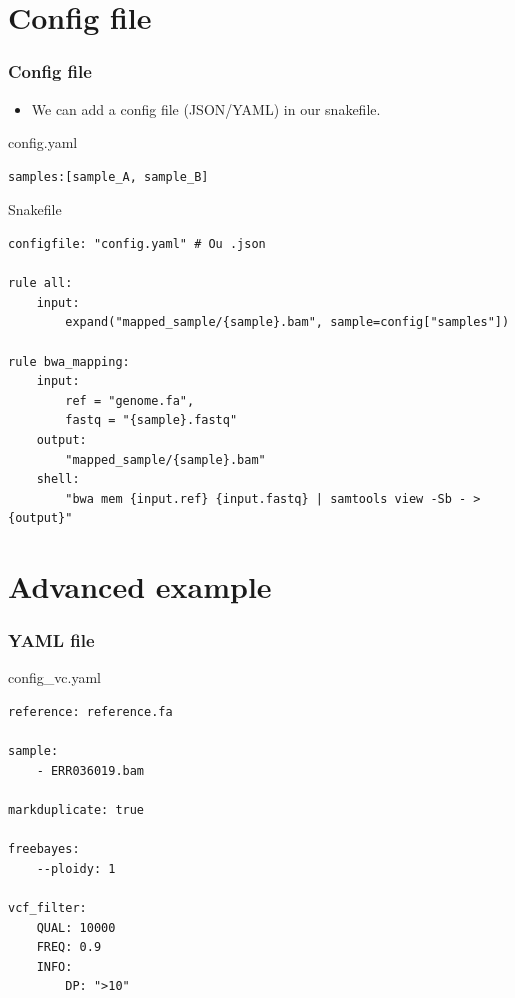 \documentclass{beamer}
\begin{document}
\section{Config file}

\begin{frame}[fragile]
    \frametitle{Config file}
    \begin{itemize}
        \item We can add a config file (JSON/YAML) in our snakefile.
    \end{itemize}
    \begin{block}{config.yaml}
        \begin{lstlisting}
samples:[sample_A, sample_B]
        \end{lstlisting}
    \end{block}
    \begin{block}{Snakefile}
    \begin{lstlisting}
configfile: "config.yaml" # Ou .json

rule all:
    input:
        expand("mapped_sample/{sample}.bam", sample=config["samples"])

rule bwa_mapping:
    input:
        ref = "genome.fa",
        fastq = "{sample}.fastq"
    output:
        "mapped_sample/{sample}.bam"
    shell:
        "bwa mem {input.ref} {input.fastq} | samtools view -Sb - > {output}"
    \end{lstlisting}
    \end{block}
\end{frame}

\section{Advanced example}

\begin{frame}[fragile]
    \frametitle{YAML file}
    \begin{block}{config\_vc.yaml}
    \begin{lstlisting}
reference: reference.fa

sample: 
    - ERR036019.bam

markduplicate: true

freebayes:
    --ploidy: 1

vcf_filter:
    QUAL: 10000
    FREQ: 0.9
    INFO:
        DP: ">10"
    \end{lstlisting}
    \end{block}
\end{frame}
\end{document}
